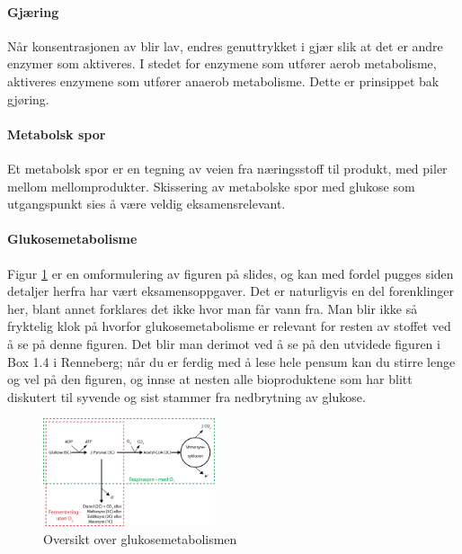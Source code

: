 \paragraph{Gjæring} Når konsentrasjonen av  blir lav, endres genuttrykket i gjær slik at det er andre enzymer som aktiveres. I stedet for enzymene som utfører aerob metabolisme, aktiveres enzymene som utfører anaerob metabolisme. Dette er prinsippet bak gjøring.

\paragraph{Metabolsk spor} Et metabolsk spor er en tegning av veien fra næringsstoff til produkt, med piler mellom mellomprodukter. Skissering av metabolske spor med glukose som utgangspunkt sies å være veldig eksamensrelevant. 

\paragraph{Glukosemetabolisme} Figur \ref{fig:glucose} er en omformulering av figuren på slides, og kan med fordel pugges siden detaljer herfra har vært eksamensoppgaver. Det er naturligvis en del forenklinger her, blant annet forklares det ikke hvor man får vann fra. Man blir ikke så fryktelig klok på hvorfor glukosemetabolisme er relevant for resten av stoffet ved å se på denne figuren. Det blir man derimot ved å se på den utvidede figuren i Box 1.4 i Renneberg; når du er ferdig med å lese hele pensum kan du stirre lenge og vel på den figuren, og innse at nesten alle bioproduktene som har blitt diskutert til syvende og sist stammer fra nedbrytning av glukose.

\begin{figure}[H]
	\centering
	\includegraphics[width=0.45\textwidth]{glucose}
	\caption{Oversikt over glukosemetabolismen}
	\label{fig:glucose}
\end{figure}
